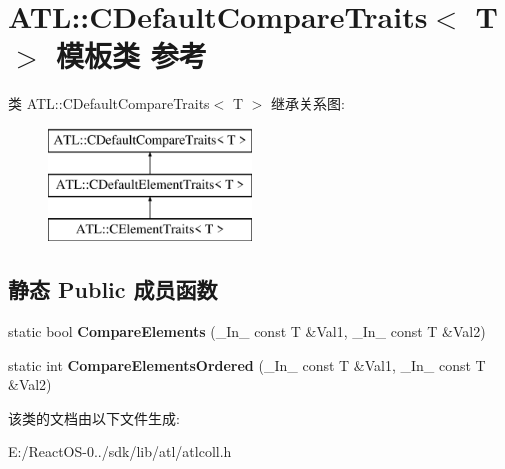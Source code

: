 \hypertarget{class_a_t_l_1_1_c_default_compare_traits}{}\section{A\+TL\+:\+:C\+Default\+Compare\+Traits$<$ T $>$ 模板类 参考}
\label{class_a_t_l_1_1_c_default_compare_traits}
类 A\+TL\+:\+:C\+Default\+Compare\+Traits$<$ T $>$ 继承关系图\+:\begin{figure}[H]
\begin{center}
\leavevmode
\includegraphics[height=3.000000cm]{class_a_t_l_1_1_c_default_compare_traits}
\end{center}
\end{figure}
\subsection*{静态 Public 成员函数}
\begin{DoxyCompactItemize}
\item 
\mbox{\label{class_a_t_l_1_1_c_default_compare_traits_ad93d83a9bbe2694b391fcbc3665ce2e8}} 
static bool {\bfseries Compare\+Elements} (\+\_\+\+In\+\_\+ const T \&Val1, \+\_\+\+In\+\_\+ const T \&Val2)
\item 
\mbox{\label{class_a_t_l_1_1_c_default_compare_traits_a0eaf09d85faaeda5f837eb622bffd42d}} 
static int {\bfseries Compare\+Elements\+Ordered} (\+\_\+\+In\+\_\+ const T \&Val1, \+\_\+\+In\+\_\+ const T \&Val2)
\end{DoxyCompactItemize}


该类的文档由以下文件生成\+:\begin{DoxyCompactItemize}
\item 
E\+:/\+React\+O\+S-\/0../sdk/lib/atl/atlcoll.\+h\end{DoxyCompactItemize}
